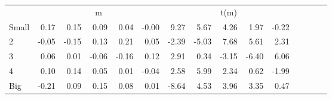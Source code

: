 \begin{table}[!ht]
\begin{tabular}{lrrrrrrrrrrrrrr}
      & \multicolumn{5}{c}{m} & \multicolumn{5}{c}{t(m)}
    
    \\
      \cmidrule(r){2-6} \cmidrule(r){7-11}

    Small   & 0.17  & 0.15  & 0.09  & 0.04  & -0.00  & 9.27  & 5.67  & 4.26  & 1.97  & -0.22  \\
         2  & -0.05  & -0.15  & 0.13  & 0.21  & 0.05  & -2.39  & -5.03  & 7.68  & 5.61  & 2.31  \\
         3  & 0.06  & 0.01  & -0.06  & -0.16  & 0.12  & 2.91  & 0.34  & -3.15  & -6.40  & 6.06  \\
         4  & 0.10  & 0.14  & 0.05  & 0.01  & -0.04  & 2.58  & 5.99  & 2.34  & 0.62  & -1.99  \\
    Big     & -0.21  & 0.09  & 0.15  & 0.08  & 0.01  & -8.64  & 4.53  & 3.96  & 3.35  & 0.47  \\

  

  \bottomrule
\end{tabular}
\label{tbl:25_Size_NI_C97b}
\end{table}